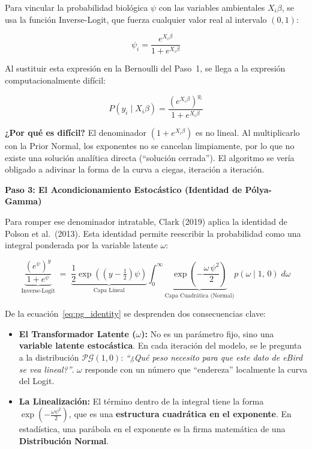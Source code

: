 \documentclass[12pt, a4paper]{article}
\begin{document}
Para vincular la probabilidad biológica $\psi$ con las variables ambientales $X_i\beta$, se usa la función Inverse-Logit, que fuerza cualquier valor real al intervalo $(0,1)$:

\begin{equation}
  \psi_i = \frac{e^{X_i\beta}}{1 + e^{X_i\beta}}
\end{equation}

Al sustituir esta expresión en la Bernoulli del Paso~1, se llega a la expresión computacionalmente difícil:

\begin{equation}
  P(y_i \mid X_i\beta) = \frac{\left(e^{X_i\beta}\right)^{y_i}}{1 + e^{X_i\beta}}
\end{equation}

\begin{notabox}
\small \textbf{¿Por qué es difícil?} El denominador $\left(1 + e^{X_i\beta}\right)$ es no lineal. Al multiplicarlo con la Prior Normal, los exponentes no se cancelan limpiamente, por lo que no existe una solución analítica directa (``solución cerrada''). El algoritmo se vería obligado a adivinar la forma de la curva a ciegas, iteración a iteración.
\end{notabox}

\medskip
\textbf{Paso 3: El Acondicionamiento Estocástico (Identidad de Pólya-Gamma)}

Para romper ese denominador intratable, Clark (2019) aplica la identidad de Polson et al.\ (2013). Esta identidad permite reescribir la probabilidad como una integral ponderada por la variable latente $\omega$:

\begin{equation}
  \underbrace{\dfrac{\left(e^{\psi}\right)^y}{1+e^{\psi}}}_{\text{Inverse-Logit}}
  \;=\;
  \underbrace{\dfrac{1}{2}\exp\!\left((y - \tfrac{1}{2})\psi\right)}_{\text{Capa Lineal}}
  \int_0^{\infty}
  \underbrace{\exp\!\left(-\dfrac{\omega\,\psi^2}{2}\right)}_{\text{Capa Cuadrática (Normal)}}
  p(\omega \mid 1,\, 0)\; d\omega
  \label{eq:pg_identity}
\end{equation}

De la ecuación~\eqref{eq:pg_identity} se desprenden dos consecuencias clave:

\begin{itemize}
  \item \textbf{El Transformador Latente ($\omega$):} No es un parámetro fijo, sino una \textbf{variable latente estocástica}. En cada iteración del modelo, se le pregunta a la distribución $\mathcal{PG}(1,0)$: \textit{``¿Qué peso necesito para que este dato de eBird se vea lineal?''}. $\omega$ responde con un número que ``endereza'' localmente la curva del Logit.
  \item \textbf{La Linealización:} El término dentro de la integral tiene la forma $\exp\!\left(-\tfrac{\omega\psi^2}{2}\right)$, que es una \textbf{estructura cuadrática en el exponente}. En estadística, una parábola en el exponente es la firma matemática de una \textbf{Distribución Normal}.
\end{itemize}
\end{document}

